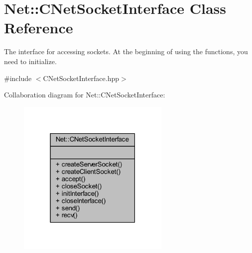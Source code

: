 \hypertarget{class_net_1_1_c_net_socket_interface}{}\section{Net\+:\+:C\+Net\+Socket\+Interface Class Reference}
\label{class_net_1_1_c_net_socket_interface}


The interface for accessing sockets. At the beginning of using the functions, you need to initialize.  




{\ttfamily \#include $<$C\+Net\+Socket\+Interface.\+hpp$>$}



Collaboration diagram for Net\+:\+:C\+Net\+Socket\+Interface\+:
\nopagebreak
\begin{figure}[H]
\begin{center}
\leavevmode
\includegraphics[width=207pt]{class_net_1_1_c_net_socket_interface__coll__graph}
\end{center}
\end{figure}

